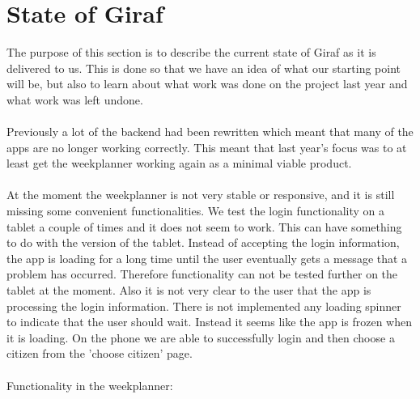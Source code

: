 \section{State of Giraf}
The purpose of this section is to describe the current state of Giraf as it is delivered to us. 
This is done so that we have an idea of what our starting point will be,
but also to learn about what work was done on the project last year and what work was left undone. 
\\\\
Previously a lot of the backend had been rewritten which meant that many of the apps are no longer working correctly. 
This meant that last year's focus was to at least get the weekplanner working again as a minimal viable product.
\\\\
At the moment the weekplanner is not very stable or responsive, and it is still missing some convenient functionalities. 
We test the login functionality on a tablet a couple of times and it does not seem to work. This can have something to do with the version of the tablet.
Instead of accepting the login information, the app is loading for a long time until the user eventually gets a message that a problem has occurred. 
Therefore functionality can not be tested further on the tablet at the moment. Also it is not very clear to the user that the app is processing the login information. 
There is not implemented any loading spinner to indicate that the user should wait. Instead it seems like the app is frozen when it is loading.
On the phone we are able to successfully login and then choose a citizen from the 'choose citizen' page.
\\\\
Functionality in the weekplanner:
